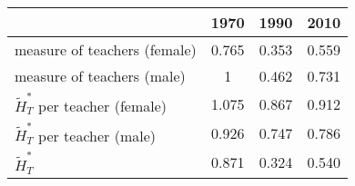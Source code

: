 \begin{table}
  \centering \begin{tabular}{lccc}
\toprule
& 1970 & 1990 & 2010 \\
\midrule
measure of teachers (female) & 0.765 & 0.353 &0.559\\
measure of teachers (male) & 1 & 0.462 & 0.731\\
$\widetilde{H}_T^*$ per teacher (female)   & 1.075 & 0.867 & 0.912 \\
$\widetilde{H}_T^*$ per teacher (male)   & 0.926 & 0.747 & 0.786 \\
$\widetilde{H}_T^*$ & 0.871  & 0.324 & 0.540 \\
\bottomrule
\end{tabular}
  \label{ }
\end{table}
